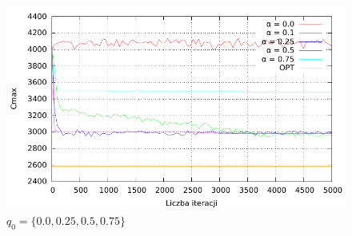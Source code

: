 \documentclass[10pt,a4paper]{article}
\begin{document}
\begin{figure}[h]
    \centering
    \includegraphics{./figures/inst01_rnd_alpha_smooth.pdf}
    \caption{$ q_0 = \{ 0.0, 0.25, 0.5, 0.75 \} $}
\end{figure}
\end{document}
